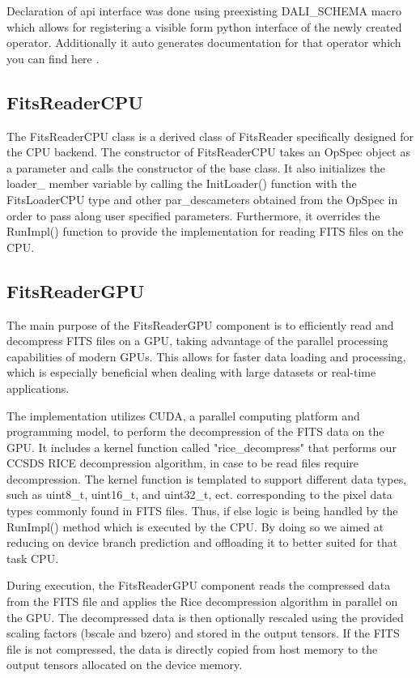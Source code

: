 \documentclass[licencjacka,en]{pracamgr}
\begin{document}
Declaration of api interface was done using preexisting DALI\_SCHEMA macro which allows for registering a visible form python interface of the newly created operator. Additionally it auto generates documentation for that operator which you can find here \cite{fitsreader-docs}.


\subsection{FitsReaderCPU}
The FitsReaderCPU class is a derived class of FitsReader specifically designed for the CPU backend. The constructor of FitsReaderCPU takes an OpSpec object as a parameter and calls the constructor of the base class. It also initializes the loader\_ member variable by calling the InitLoader() function with the FitsLoaderCPU type and other par\_descameters obtained from the OpSpec in order to pass along user specified parameters. Furthermore, it overrides the RunImpl() function to provide the implementation for reading FITS files on the CPU. 


\subsection{FitsReaderGPU}
The main purpose of the FitsReaderGPU component is to efficiently read and decompress FITS files on a GPU, taking advantage of the parallel processing capabilities of modern GPUs. This allows for faster data loading and processing, which is especially beneficial when dealing with large datasets or real-time applications.

The implementation utilizes CUDA, a parallel computing platform and programming model, to perform the decompression of the FITS data on the GPU. It includes a kernel function called "rice\_decompress" that performs our CCSDS RICE decompression algorithm, in case to be read files require decompression. The kernel function is templated to support different data types, such as uint8\_t, uint16\_t, and uint32\_t, ect. corresponding to the pixel data types commonly found in FITS files. Thus, if else logic is being handled by 
the RunImpl() method which is executed by the CPU. By doing so we aimed at reducing on device branch prediction and offloading it to better suited for that task CPU. 

During execution, the FitsReaderGPU component reads the compressed data from the FITS file and applies the Rice decompression algorithm in parallel on the GPU. The decompressed data is then optionally rescaled using the provided scaling factors (bscale and bzero) and stored in the output tensors. If the FITS file is not compressed, the data is directly copied from host memory to the output tensors allocated on the device memory.
\end{document}
